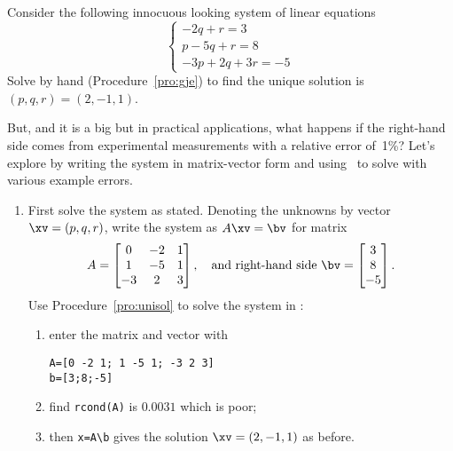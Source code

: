 \begin{example} \label{eg:ilsle}
Consider the following innocuous looking system of linear equations
\begin{equation*}
\begin{cases}
-2q+r=3
\\p-5q+r=8
\\-3p+2q+3r=-5
\end{cases}
\end{equation*}
Solve by hand (Procedure~\ref{pro:gje}) to find the unique solution is \((p,q,r)=(2,-1,1)\).

But, and it is a big but in practical applications, what happens if the right-hand side comes from experimental measurements with a relative error of~1\%? 
Let's explore by writing the system in matrix-vector form and using \script\ to solve with various example errors.
\begin{enumerate}
\item First solve the system as stated.  
Denoting the unknowns by vector \(\xv=(p,q,r)\), write the system as \(A\xv=\bv\) for matrix
\begin{equation*}
A=\begin{bmatrix} 0&-2&1
\\1&-5&1
\\-3&2&3 \end{bmatrix},
\quad\text{and right-hand side }
\bv=\begin{bmatrix} 3\\8\\-5 \end{bmatrix}.
\end{equation*}
Use Procedure~\ref{pro:unisol} to solve the system in \script:
\begin{enumerate}
\item enter the matrix and vector with
\setbox\ajrqrbox\hbox{}%
\marginpar{\usebox{\ajrqrbox\\[2ex]}}%
\begin{verbatim}
A=[0 -2 1; 1 -5 1; -3 2 3]
b=[3;8;-5]
\end{verbatim}
\item find \verb|rcond(A)| is \(0.0031\) which is poor;
\item then \verb|x=A\b| gives the solution \(\xv=(2,-1,1)\) as before.
\end{enumerate}


\end{enumerate}
\end{example}
